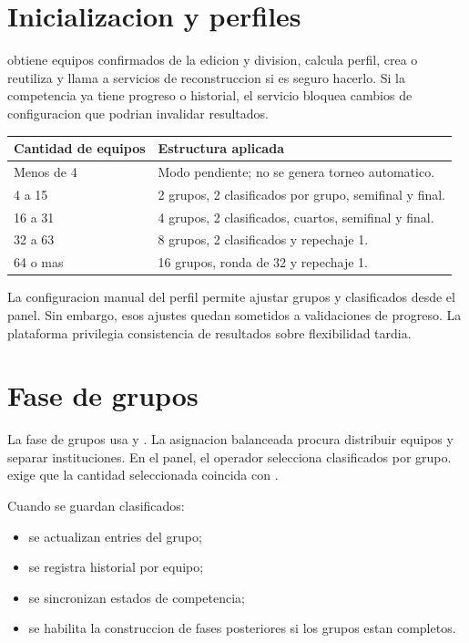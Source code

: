 \section{Inicializacion y perfiles}
\label{sec:flujo-inicializacion}

 obtiene equipos confirmados de la edicion y division, calcula perfil, crea o reutiliza  y llama a servicios de reconstruccion si es seguro hacerlo. Si la competencia ya tiene progreso o historial, el servicio bloquea cambios de configuracion que podrian invalidar resultados.

\begin{longtable}{p{3.2cm}p{9.5cm}}
\toprule
Cantidad de equipos & Estructura aplicada \\
\midrule
Menos de 4 & Modo pendiente; no se genera torneo automatico. \\
4 a 15 & 2 grupos, 2 clasificados por grupo, semifinal y final. \\
16 a 31 & 4 grupos, 2 clasificados, cuartos, semifinal y final. \\
32 a 63 & 8 grupos, 2 clasificados y repechaje 1. \\
64 o mas & 16 grupos, ronda de 32 y repechaje 1. \\
\bottomrule
\end{longtable}

La configuracion manual del perfil permite ajustar grupos y clasificados desde el panel. Sin embargo, esos ajustes quedan sometidos a validaciones de progreso. La plataforma privilegia consistencia de resultados sobre flexibilidad tardia.

\section{Fase de grupos}
\label{sec:flujo-grupos}

La fase de grupos usa  y . La asignacion balanceada procura distribuir equipos y separar instituciones. En el panel, el operador selecciona clasificados por grupo.  exige que la cantidad seleccionada coincida con .

Cuando se guardan clasificados:

\begin{itemize}
  \item se actualizan entries del grupo;
  \item se registra historial por equipo;
  \item se sincronizan estados de competencia;
  \item se habilita la construccion de fases posteriores si los grupos estan completos.
\end{itemize}


